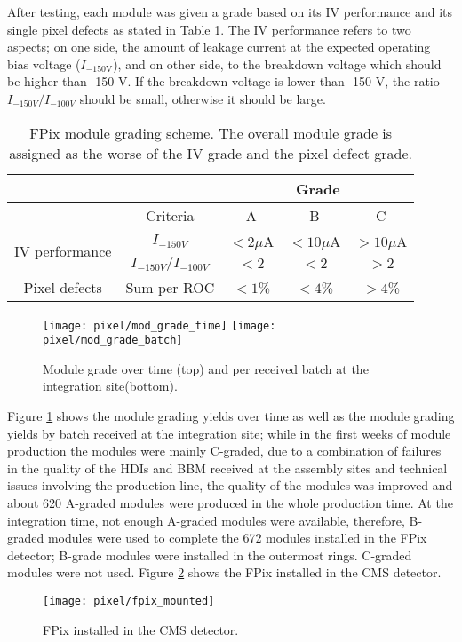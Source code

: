 After testing, each module was given a grade based on its IV performance and its single pixel defects as stated in Table \ref{tab:grad_scheme}. The IV performance refers to two aspects; on one side, the amount of leakage current at the expected operating bias voltage ($I_{-150\textrm{V}}$), and on other side, to the breakdown voltage which should be higher than -150 V. If the breakdown voltage is lower than -150 V, the ratio $I_{-150V}/I_{-100V}$ should be small, otherwise it should be large.      

\begin{table}
  \centering
  \begin{tabular}{ c  c  c  c  c } \hline
                                    &                       & \multicolumn{3}{c}{Grade} \\\hline
                                    & Criteria              & A        &  B         &   C       \\\hline
    \multirow{2}{*}{IV performance} & $I_{-150V}$           & $<2\mu$A &  $<10\mu$A & $>10\mu$A \\
                                    & $I_{-150V}/I_{-100V}$ & $<2$     &  $<2$      & $>2$      \\\hline
    Pixel defects                   & Sum per ROC           & $<1$\%   &  $<4$\%    & $>4$\%    \\\hline
  \end{tabular}
  \caption[FPix module grading scheme.]{FPix module grading scheme. The overall module grade is assigned as the worse of the IV grade and the pixel defect grade.}\label{tab:grad_scheme}
\end{table}

\begin{figure}[h]
\begin{center}
  \texttt{[image: pixel/mod\_grade\_time]}
  \texttt{[image: pixel/mod\_grade\_batch]}
  \caption[Module grade over time.]{Module grade over time (top) and per received batch at the integration site(bottom).}\label{fig:mod_grad_time}
\end{center}
\end{figure}
Figure \ref{fig:mod_grad_time} shows the module grading yields over time as well as the module grading yields by batch received at the integration site; while in the first weeks of module production the modules were mainly C-graded, due to a combination of failures in the quality of the HDIs and BBM received at the assembly sites and technical issues involving the production line, the quality of the modules was improved and about 620 A-graded modules were produced in the whole production time. At the integration time, not enough A-graded modules were available, therefore, B-graded modules were used to complete the 672 modules installed in the FPix detector; B-grade modules were installed in the outermost rings. C-graded modules were not used. Figure \ref{fig:fpix_mounted} shows the FPix installed in the CMS detector.

\begin{figure}[h]
\begin{center}
  \texttt{[image: pixel/fpix\_mounted]}
  \caption{FPix installed in the CMS detector.}\label{fig:fpix_mounted}
\end{center}
\end{figure}

